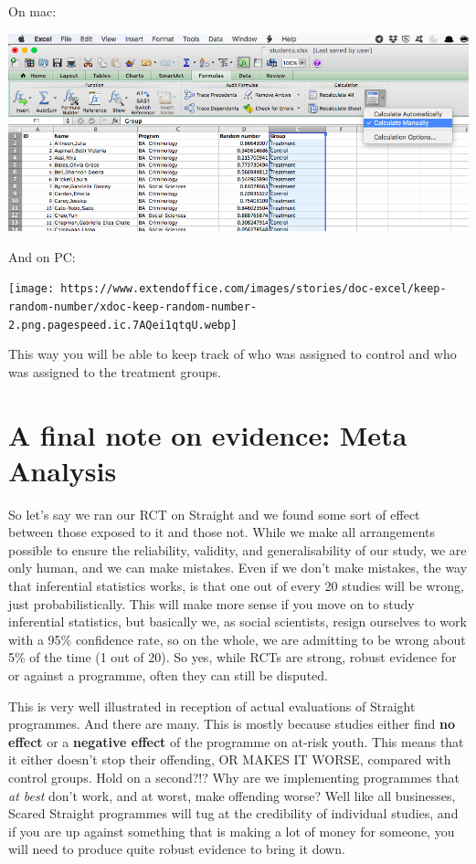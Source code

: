 \documentclass[]{book}
\theoremstyle{definition}
\theoremstyle{definition}
\theoremstyle{definition}
\theoremstyle{remark}
\begin{document}
On mac:

\includegraphics{imgs/calc_man.png}

And on PC:

\texttt{[image: https://www.extendoffice.com/images/stories/doc-excel/keep-random-number/xdoc-keep-random-number-2.png.pagespeed.ic.7AQei1qtqU.webp]}

This way you will be able to keep track of who was assigned to control
and who was assigned to the treatment groups.

\hypertarget{a-final-note-on-evidence-meta-analysis}{%
\section{A final note on evidence: Meta
Analysis}\label{a-final-note-on-evidence-meta-analysis}}

So let's say we ran our RCT on Straight and we found some sort of effect
between those exposed to it and those not. While we make all
arrangements possible to ensure the reliability, validity, and
generalisability of our study, we are only human, and we can make
mistakes. Even if we don't make mistakes, the way that inferential
statistics works, is that one out of every 20 studies will be wrong,
just probabilistically. This will make more sense if you move on to
study inferential statistics, but basically we, as social scientists,
resign ourselves to work with a 95\% confidence rate, so on the whole,
we are admitting to be wrong about 5\% of the time (1 out of 20). So
yes, while RCTs are strong, robust evidence for or against a programme,
often they can still be disputed.

This is very well illustrated in reception of actual evaluations of
Straight programmes. And there are many. This is mostly because studies
either find \textbf{no effect} or a \textbf{negative effect} of the
programme on at-risk youth. This means that it either doesn't stop their
offending, OR MAKES IT WORSE, compared with control groups. Hold on a
second?!? Why are we implementing programmes that \emph{at best} don't
work, and at worst, make offending worse? Well like all businesses,
Scared Straight programmes will tug at the credibility of individual
studies, and if you are up against something that is making a lot of
money for someone, you will need to produce quite robust evidence to
bring it down.
\end{document}
